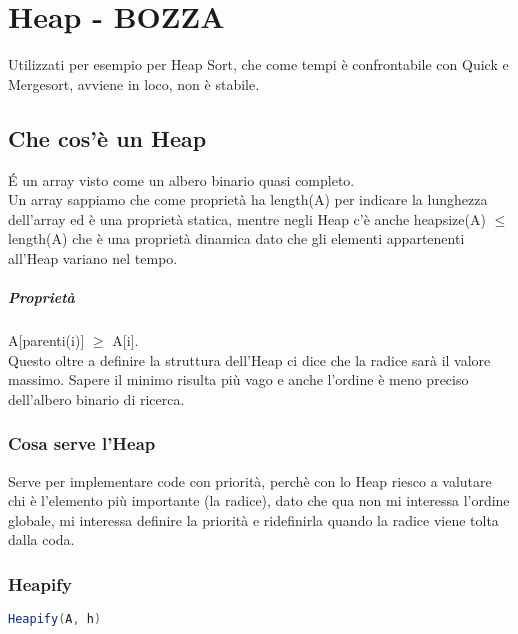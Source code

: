 \chapter{Heap - BOZZA}
Utilizzati per esempio per Heap Sort, che come tempi è
confrontabile con Quick e Mergesort, avviene in loco, non è stabile.
\section{Che cos'è un Heap}
\'E un array visto come un albero binario quasi completo.\\
Un array sappiamo che come proprietà ha length(A) per indicare la lunghezza 
dell'array ed è una proprietà statica, mentre negli Heap c'è anche
heapsize(A) $\leq$ length(A) che è una proprietà dinamica dato che gli elementi
appartenenti all'Heap variano nel tempo.
\paragraph*{Proprietà} A[parenti(i)] $\geq$ A[i].\\
Questo oltre a definire la struttura dell'Heap ci dice che la radice sarà il valore
massimo. Sapere il minimo risulta più vago e anche l'ordine è meno preciso dell'albero binario
di ricerca.\\
\subsection{Cosa serve l'Heap}
Serve per implementare code con priorità, perchè con lo Heap riesco a valutare
chi è l'elemento più importante (la radice), dato che qua non mi interessa l'ordine globale,
mi interessa definire la priorità e ridefinirla quando la radice viene tolta dalla coda.
\subsection{Heapify}
\begin{lstlisting}[language=Java]
    Heapify(A, h)
\end{lstlisting}